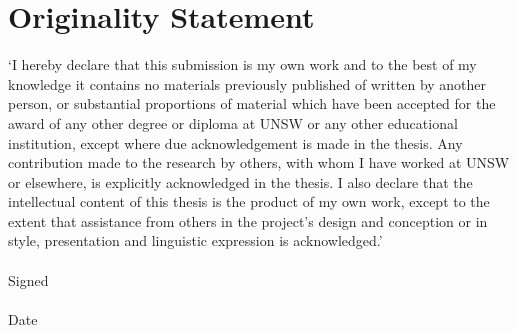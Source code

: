 \chapter*{Originality Statement}
`I hereby declare that this submission is my own work and to the best of my knowledge it contains
 no materials previously published of written by another person, or substantial proportions of 
material which have been accepted for the award of any other degree or diploma at UNSW or any other
 educational institution, except where due acknowledgement is made in the thesis. Any contribution 
made to the research by others, with whom I have worked at UNSW or elsewhere, is explicitly 
acknowledged in the thesis. I also declare that the intellectual content of this thesis is the product
 of my own work, except to the extent that assistance from others in the project's design and 
conception or in style, presentation and linguistic expression is acknowledged.'\\\\
Signed \dotfill\\\\
Date \dotfill
